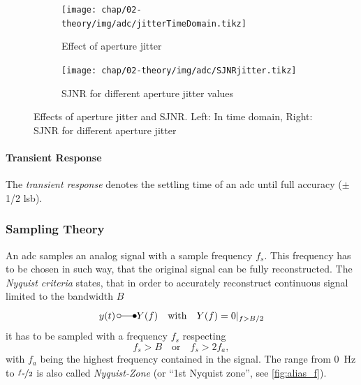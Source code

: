 \begin{figure}[tb]
	\centering
	\begin{subfigure}{0.48\textwidth}
		\centering
		\texttt{[image: chap/02-theory/img/adc/jitterTimeDomain.tikz]}  
		\caption{Effect of aperture jitter}
		\label{fig:jitter}
	\end{subfigure}
	\hfill
	\begin{subfigure}{0.48\textwidth}
		\centering
		\texttt{[image: chap/02-theory/img/adc/SJNRjitter.tikz]}  
		\caption{SJNR for different aperture jitter values}
		\label{fig:sjnr}
	\end{subfigure}
	\caption[Aperture jitter and SJNR]{Effects of aperture jitter and SJNR. Left: In time domain, Right: SJNR for different aperture jitter \cite{Lundberg}}
	\label{fig:ap_jit}
\end{figure}

\paragraph{Transient Response}
The \textit{transient response} denotes the settling time of an \gls{adc} until full accuracy ($\pm$ 1/2 \gls{lsb}).


\subsubsection{Sampling Theory}
An \gls{adc} samples an analog signal with a sample frequency $f_s$.
This frequency has to be chosen in such way, that the original signal can be fully reconstructed.
The \textit{Nyquist criteria} states, that in order to accurately reconstruct continuous signal limited to the bandwidth $B$
\begin{equation}
	y (t) \, \laplace  Y(f) \quad \text{with} \quad Y(f)=0\vert_{f>B/2}
\end{equation} %
it has to be sampled with a frequency $f_s$ respecting
\begin{equation} \label{eq:nyquist}
	f_s > B \quad \text{or} \quad f_s > 2 f_a,
\end{equation}
with $f_a$ being the highest frequency contained in the signal. \cite{walt,puente2015}
The range from \SI{0}{\Hz} to $\nicefrac{f_s}{2}$ is also called \textit{Nyquist-Zone} (or ``1st Nyquist zone'', see \autoref{fig:alias_f}).


